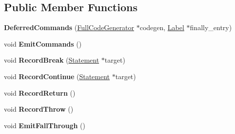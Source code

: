 \subsection*{Public Member Functions}
\begin{DoxyCompactItemize}
\item 
{\bfseries Deferred\+Commands} (\hyperlink{classv8_1_1internal_1_1_full_code_generator}{Full\+Code\+Generator} $\ast$codegen, \hyperlink{classv8_1_1internal_1_1_label}{Label} $\ast$finally\+\_\+entry)\hypertarget{classv8_1_1internal_1_1_full_code_generator_1_1_deferred_commands_a5a0b74f6448875b19757691fdd2cd51b}{}\label{classv8_1_1internal_1_1_full_code_generator_1_1_deferred_commands_a5a0b74f6448875b19757691fdd2cd51b}

\item 
void {\bfseries Emit\+Commands} ()\hypertarget{classv8_1_1internal_1_1_full_code_generator_1_1_deferred_commands_a007dc8175a5aeba087328c1e3526e0fd}{}\label{classv8_1_1internal_1_1_full_code_generator_1_1_deferred_commands_a007dc8175a5aeba087328c1e3526e0fd}

\item 
void {\bfseries Record\+Break} (\hyperlink{classv8_1_1internal_1_1_statement}{Statement} $\ast$target)\hypertarget{classv8_1_1internal_1_1_full_code_generator_1_1_deferred_commands_ad9961531aa4ce3facc514322890cd75f}{}\label{classv8_1_1internal_1_1_full_code_generator_1_1_deferred_commands_ad9961531aa4ce3facc514322890cd75f}

\item 
void {\bfseries Record\+Continue} (\hyperlink{classv8_1_1internal_1_1_statement}{Statement} $\ast$target)\hypertarget{classv8_1_1internal_1_1_full_code_generator_1_1_deferred_commands_a0ef01b641bba33c351fec63c370866fc}{}\label{classv8_1_1internal_1_1_full_code_generator_1_1_deferred_commands_a0ef01b641bba33c351fec63c370866fc}

\item 
void {\bfseries Record\+Return} ()\hypertarget{classv8_1_1internal_1_1_full_code_generator_1_1_deferred_commands_a6fc1e9018bcd115432e786235dde9f8a}{}\label{classv8_1_1internal_1_1_full_code_generator_1_1_deferred_commands_a6fc1e9018bcd115432e786235dde9f8a}

\item 
void {\bfseries Record\+Throw} ()\hypertarget{classv8_1_1internal_1_1_full_code_generator_1_1_deferred_commands_a4bbc5f504b4068399704668c69902273}{}\label{classv8_1_1internal_1_1_full_code_generator_1_1_deferred_commands_a4bbc5f504b4068399704668c69902273}

\item 
void {\bfseries Emit\+Fall\+Through} ()\hypertarget{classv8_1_1internal_1_1_full_code_generator_1_1_deferred_commands_a3f087cd35a2f4c61255d0a87c0baa01a}{}\label{classv8_1_1internal_1_1_full_code_generator_1_1_deferred_commands_a3f087cd35a2f4c61255d0a87c0baa01a}

\end{DoxyCompactItemize}
